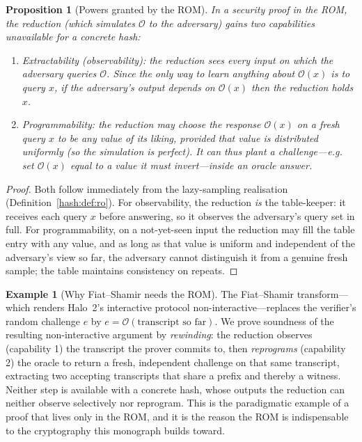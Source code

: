 \documentclass[11pt,a4paper]{article}
\newtheorem{proposition}[theorem]{Proposition}
\theoremstyle{definition}
\newtheorem{example}[theorem]{Example}
\theoremstyle{remark}
\begin{document}
\begin{proposition}[Powers granted by the ROM]\label{hash:prop:roproperties}
In a security proof in the ROM, the reduction (which simulates \(\mathcal{O}\) to the adversary) gains two capabilities unavailable for a concrete hash:
\begin{enumerate}
  \item \emph{Extractability (observability):} the reduction sees every input on which the adversary queries \(\mathcal{O}\). Since the only way to learn anything about \(\mathcal{O}(x)\) is to query \(x\), if the adversary's output depends on \(\mathcal{O}(x)\) then the reduction holds \(x\).
  \item \emph{Programmability:} the reduction may choose the response \(\mathcal{O}(x)\) on a fresh query \(x\) to be \emph{any} value of its liking, provided that value is distributed uniformly (so the simulation is perfect). It can thus plant a challenge---e.g. set \(\mathcal{O}(x)\) equal to a value it must invert---inside an oracle answer.
\end{enumerate}
\end{proposition}

\begin{proof}
Both follow immediately from the lazy-sampling realisation (Definition~\ref{hash:def:ro}). For observability, the reduction \emph{is} the table-keeper: it receives each query \(x\) before answering, so it observes the adversary's query set in full. For programmability, on a not-yet-seen input the reduction may fill the table entry with any value, and as long as that value is uniform and independent of the adversary's view so far, the adversary cannot distinguish it from a genuine fresh sample; the table maintains consistency on repeats.
\end{proof}

\begin{example}[Why Fiat--Shamir needs the ROM]\label{hash:ex:fiatshamir}
The Fiat--Shamir transform---which renders Halo~2's interactive protocol non-interactive---replaces the verifier's random challenge \(e\) by \(e = \mathcal{O}(\text{transcript so far})\). We prove soundness of the resulting non-interactive argument by \emph{rewinding}: the reduction observes (capability 1) the transcript the prover commits to, then \emph{reprograms} (capability 2) the oracle to return a fresh, independent challenge on that same transcript, extracting two accepting transcripts that share a prefix and thereby a witness. Neither step is available with a concrete hash, whose outputs the reduction can neither observe selectively nor reprogram. This is the paradigmatic example of a proof that lives only in the ROM, and it is the reason the ROM is indispensable to the cryptography this monograph builds toward.
\end{example}
\end{document}
